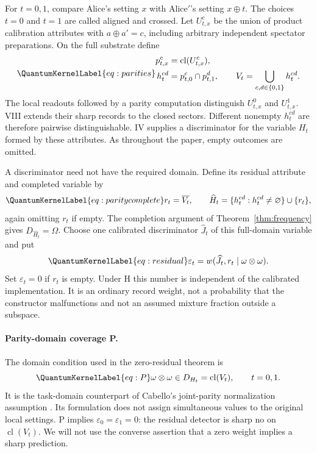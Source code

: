 \documentclass[a4paper,11pt,twocolumn,unpublished]{quantumarticle}
\let\label\QuantumKernelLabel
\DeclareMathOperator{\cl}{cl}
\newcommand{\eps}{\varepsilon}
\begin{document}
For $t=0,1$, compare Alice's setting $x$ with Alice$'$'s setting $x\oplus t$. The choices $t=0$ and $t=1$ are called aligned and crossed. Let $U^c_{t,x}$ be the union of product calibration attributes with $a\oplus a'=c$, including arbitrary independent spectator preparations. On the full substrate define
\begin{equation}\label{eq:parities}
\begin{aligned}
 p^c_{t,x}&=\cl(U^c_{t,x}),\\
 h^{cd}_t&=p^c_{t,0}\cap p^d_{t,1},\qquad
 V_t=\bigcup_{c,d\in\{0,1\}}h^{cd}_t.
\end{aligned}
\end{equation}
The local readouts followed by a parity computation distinguish $U^0_{t,x}$ and $U^1_{t,x}$. VIII extends their sharp records to the closed sectors. Different nonempty $h^{cd}_t$ are therefore pairwise distinguishable. IV supplies a discriminator for the variable $H_t$ formed by these attributes. As throughout the paper, empty outcomes are omitted.

A discriminator need not have the required domain. Define its residual attribute and completed variable by
\begin{equation}\label{eq:paritycomplete}
 r_t=\overline{V_t},\qquad
 \widehat H_t=\{h^{cd}_t:h^{cd}_t\ne\varnothing\}\cup\{r_t\},
\end{equation}
again omitting $r_t$ if empty. The completion argument of Theorem~\ref{thm:frequency} gives $D_{\widehat H_t}=\Omega$. Choose one calibrated discriminator $\widehat J_t$ of this full-domain variable and put
\begin{equation}\label{eq:residual}
 \eps_t=w(\widehat J_t,r_t\mid\omega\otimes\omega).
\end{equation}
Set $\eps_t=0$ if $r_t$ is empty. Under H this number is independent of the calibrated implementation. It is an ordinary record weight, not a probability that the constructor malfunctions and not an assumed mixture fraction outside a subspace.

\paragraph{Parity-domain coverage P.}
The domain condition used in the zero-residual theorem is
\begin{equation}\label{eq:P}
 \omega\otimes\omega\in D_{H_t}=\cl(V_t),\qquad t=0,1.
\end{equation}
It is the task-domain counterpart of Cabello's joint-parity normalization assumption \cite[step III, Eq.~(5), and the extension to Eq.~(10)]{cabello}. Its formulation does not assign simultaneous values to the original local settings. P implies $\eps_0=\eps_1=0$: the residual detector is sharp no on $\cl(V_t)$. We will not use the converse assertion that a zero weight implies a sharp prediction.
\end{document}
